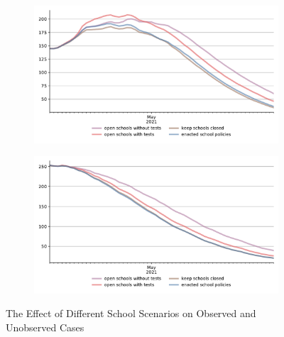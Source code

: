 \begin{figure}[ht]
  \centering
  \begin{subfigure}{.6\textwidth}
    \includegraphics[width=0.9 \textwidth]{../figures/results/figures/scenario_comparisons/school_scenarios/full_new_known_case}
  \end{subfigure}%
  \begin{subfigure}{.6\textwidth}
    \includegraphics[width=0.9 \textwidth]{../figures/results/figures/scenario_comparisons/school_scenarios/full_newly_infected}
  \end{subfigure}
  \caption{The Effect of Different School Scenarios on Observed and Unobserved Cases}
  \label{fig:school_scenarios_detailed}
\end{figure}


\FloatBarrier



\FloatBarrier
